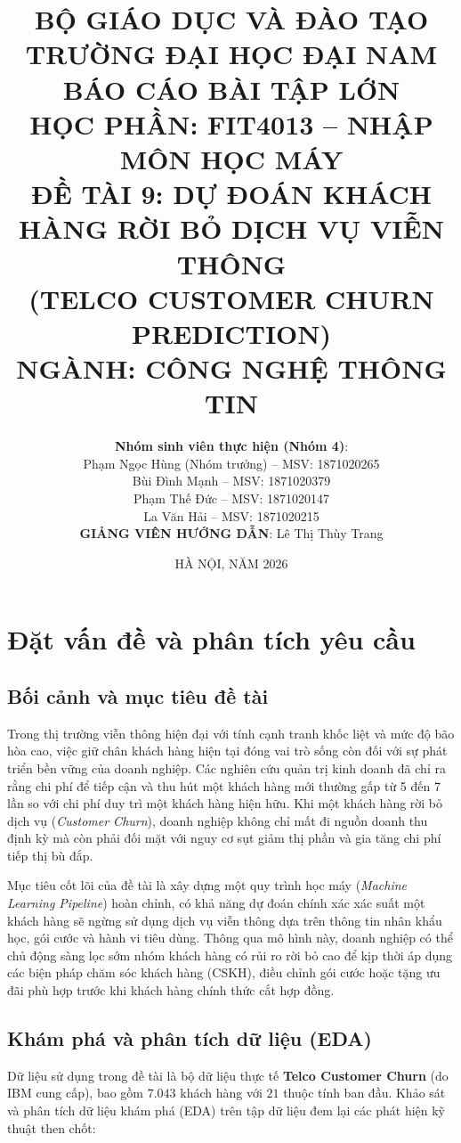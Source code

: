 \documentclass[12pt,a4paper]{article}
\title{\textbf{BỘ GIÁO DỤC VÀ ĐÀO TẠO\\TRƯỜNG ĐẠI HỌC ĐẠI NAM}\\[1cm]
\textbf{BÁO CÁO BÀI TẬP LỚN}\\
\Large HỌC PHẦN: FIT4013 -- NHẬP MÔN HỌC MÁY\\
\large \textbf{ĐỀ TÀI 9: DỰ ĐOÁN KHÁCH HÀNG RỜI BỎ DỊCH VỤ VIỄN THÔNG}\\
\large (TELCO CUSTOMER CHURN PREDICTION)\\[0.5cm]
\large \textbf{NGÀNH: CÔNG NGHỆ THÔNG TIN}}
\author{\textbf{Nhóm sinh viên thực hiện (Nhóm 4)}:\\[0.2cm]
Phạm Ngọc Hùng (Nhóm trưởng) -- MSV: 1871020265\\
Bùi Đình Mạnh -- MSV: 1871020379\\
Phạm Thế Đức -- MSV: 1871020147\\
La Văn Hải -- MSV: 1871020215\\[0.3cm]
\textbf{GIẢNG VIÊN HƯỚNG DẪN}: Lê Thị Thùy Trang}
\date{HÀ NỘI, NĂM 2026}
\begin{document}
\maketitle
\thispagestyle{empty}
\newpage

\tableofcontents
\newpage

\section{Đặt vấn đề và phân tích yêu cầu}

\subsection{Bối cảnh và mục tiêu đề tài}
Trong thị trường viễn thông hiện đại với tính cạnh tranh khốc liệt và mức độ bão hòa cao, việc giữ chân khách hàng hiện tại đóng vai trò sống còn đối với sự phát triển bền vững của doanh nghiệp. Các nghiên cứu quản trị kinh doanh đã chỉ ra rằng chi phí để tiếp cận và thu hút một khách hàng mới thường gấp từ 5 đến 7 lần so với chi phí duy trì một khách hàng hiện hữu. Khi một khách hàng rời bỏ dịch vụ (\textit{Customer Churn}), doanh nghiệp không chỉ mất đi nguồn doanh thu định kỳ mà còn phải đối mặt với nguy cơ sụt giảm thị phần và gia tăng chi phí tiếp thị bù đắp.

Mục tiêu cốt lõi của đề tài là xây dựng một quy trình học máy (\textit{Machine Learning Pipeline}) hoàn chỉnh, có khả năng dự đoán chính xác xác suất một khách hàng sẽ ngừng sử dụng dịch vụ viễn thông dựa trên thông tin nhân khẩu học, gói cước và hành vi tiêu dùng. Thông qua mô hình này, doanh nghiệp có thể chủ động sàng lọc sớm nhóm khách hàng có rủi ro rời bỏ cao để kịp thời áp dụng các biện pháp chăm sóc khách hàng (CSKH), điều chỉnh gói cước hoặc tặng ưu đãi phù hợp trước khi khách hàng chính thức cắt hợp đồng.

\subsection{Khám phá và phân tích dữ liệu (EDA)}
Dữ liệu sử dụng trong đề tài là bộ dữ liệu thực tế \textbf{Telco Customer Churn} (do IBM cung cấp), bao gồm $7.043$ khách hàng với $21$ thuộc tính ban đầu. Khảo sát và phân tích dữ liệu khám phá (EDA) trên tập dữ liệu đem lại các phát hiện kỹ thuật then chốt:
\end{document}
